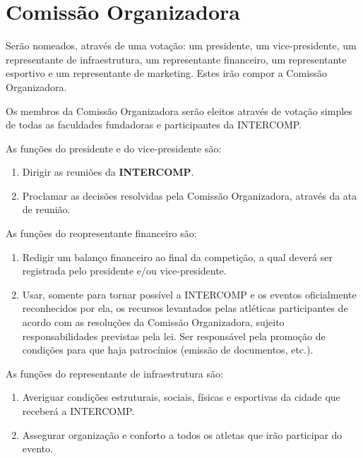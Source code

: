 {\let\clearpage\relax \chapter{Comissão Organizadora}}

\begin{article}
	Serão nomeados, através de uma votação: um presidente, um vice-presidente, um representante de infraestrutura, um representante financeiro, um representante esportivo e um representante de marketing. Estes irão compor a Comissão Organizadora.
\end{article}

\begin{article}
	Os membros da Comissão Organizadora serão eleitos através de votação simples de todas as faculdades fundadoras e participantes da INTERCOMP.

	\begin{xparagraph}
		As funções do presidente e do vice-presidente são:
		\begin{enumerate}[noitemsep]
			\item Dirigir as reuniões da \textbf{INTERCOMP}.
			\item Proclamar as decisões resolvidas pela Comissão Organizadora, através da ata de reunião.
		\end{enumerate}
	\end{xparagraph}

	\begin{xparagraph}
		As funções do reopresentante financeiro são:
		\begin{enumerate}[noitemsep]
			\item Redigir um balanço financeiro ao final da competição, a qual deverá ser registrada pelo presidente e/ou vice-presidente.
			\item Usar, somente para tornar possível a INTERCOMP e os eventos oficialmente reconhecidos por ela, os recursos levantados pelas atléticas participantes de acordo com as resoluções da Comissão Organizadora, sujeito responsabilidades previstas pela lei. Ser responsável pela promoção de condições para que haja patrocínios (emissão de documentos, etc.).
		\end{enumerate}
	\end{xparagraph}

	\begin{xparagraph}
		As funções do representante de infraestrutura são:
		\begin{enumerate}[noitemsep]
			\item Averiguar condições estruturais, sociais, físicas e esportivas da cidade que receberá a INTERCOMP.
			\item Assegurar organização e conforto a todos os atletas que irão participar do evento.
		\end{enumerate}
	\end{xparagraph}


\end{article}
